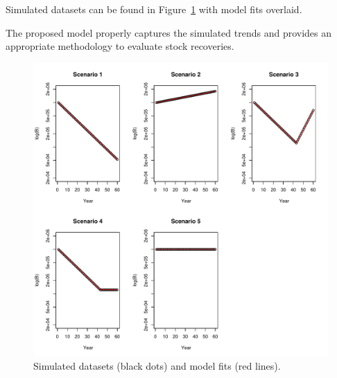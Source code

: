 \documentclass[letterpaper,12pt]{article}
\begin{document}
Simulated datasets can be found in Figure~\ref{fig:sim} with model fits overlaid. 

The proposed model properly captures the simulated trends and provides an appropriate methodology to evaluate stock recoveries.

\begin{figure}[htb]
 \begin{center}
 \includegraphics[scale=0.65]{../R/sim.pdf}
 \end{center}
 \caption{Simulated datasets (black dots) and model fits (red lines).}\label{fig:sim}
\end{figure} 

\end{document}
